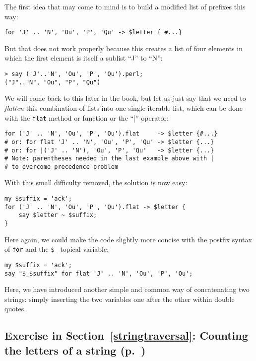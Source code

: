 The first idea that may come to mind is to build a modified 
list of prefixes this way:

\begin{verbatim}
for 'J' .. 'N', 'Ou', 'P', 'Qu' -> $letter { #...}
\end{verbatim}
%

But that does not work properly because this creates a list 
of four elements in which the first element is itself a 
sublist ``J'' to ``N'':

\begin{verbatim}
> say ('J'..'N', 'Ou', 'P', 'Qu').perl;
("J".."N", "Ou", "P", "Qu")
\end{verbatim}
%

We will come back to this later in the book, but let us just say 
that we need to \emph{flatten} this combination of lists into 
one single iterable list, which can be done with the 
{\tt flat} method or function or the ``|'' operator:

\begin{verbatim}
for ('J' .. 'N', 'Ou', 'P', 'Qu').flat     -> $letter {#...}
# or: for flat 'J' .. 'N', 'Ou', 'P', 'Qu' -> $letter {...}
# or: for |('J' .. 'N'), 'Ou', 'P', 'Qu'   -> $letter {...}
# Note: parentheses needed in the last example above with | 
# to overcome precedence problem
\end{verbatim}
%

With this small difficulty removed, the solution is now easy:

\begin{verbatim}
my $suffix = 'ack';
for ('J' .. 'N', 'Ou', 'P', 'Qu').flat -> $letter {
    say $letter ~ $suffix;
}
\end{verbatim}
%

Here again, we could make the code slightly more concise with 
the postfix syntax of {\tt for} and the \verb'$_' topical 
variable:

\begin{verbatim}
my $suffix = 'ack';
say "$_$suffix" for flat 'J' .. 'N', 'Ou', 'P', 'Qu';
\end{verbatim}
%

Here, we have introduced another simple and common way of 
concatenating two strings: simply inserting the two variables one after the other within double quotes.


\subsection{Exercise in Section~\ref{stringtraversal}: Counting the letters of a string (p.~\pageref{stringtraversal})}
\label{sol_count_letters}

